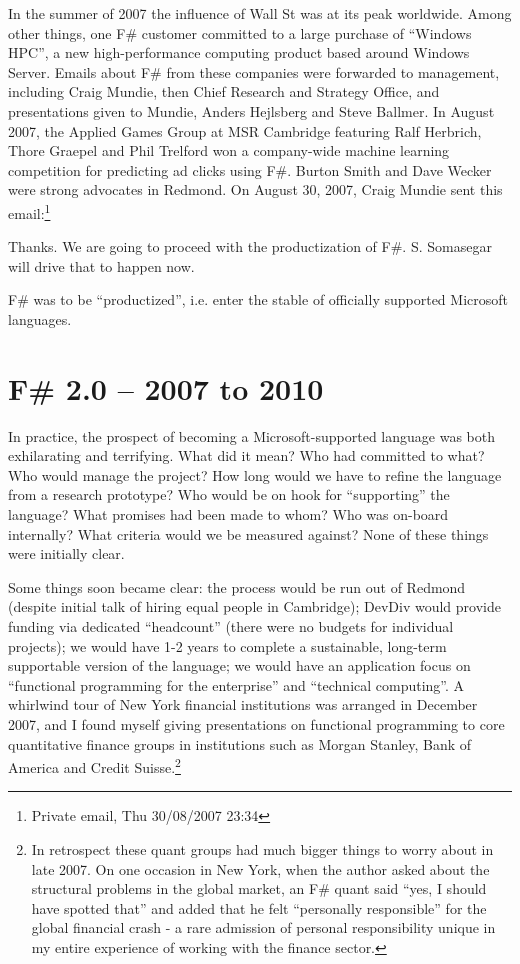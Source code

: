 \documentclass[acmsmall,review]{acmart}\settopmatter{printfolios=true,printccs=false,printacmref=false}
\begin{document}
In the summer of 2007 the influence of Wall St was at its peak worldwide. Among other things, one F\# customer
committed to a large purchase of “Windows HPC”, a new high-performance computing product based around
Windows Server. Emails about F\# from these companies were forwarded to management, including Craig Mundie,
then Chief Research and Strategy Office, and presentations given to Mundie, Anders Hejlsberg and Steve Ballmer.
In August 2007, the Applied Games Group at MSR Cambridge featuring Ralf Herbrich, Thore Graepel and Phil
Trelford won a company-wide machine learning competition for predicting ad clicks using F\#.  Burton Smith and
Dave Wecker were strong advocates in Redmond. On August 30, 2007, Craig Mundie sent this email:\footnote{Private email, Thu 30/08/2007 23:34}
\begin{verbquote}
Thanks.  We are going to proceed with the productization of F\#.  S. Somasegar will drive that to happen now.
\end{verbquote}
F\# was to be “productized”, i.e. enter the stable of officially supported Microsoft languages.

\section*{F\# 2.0 – 2007 to 2010}

In practice, the prospect of becoming a Microsoft-supported language was both exhilarating and terrifying. What did
it mean? Who had committed to what?  Who would manage the project? How long would we have to refine the
language from a research prototype?  Who would be on hook for “supporting” the language? What promises
had been made to whom? Who was on-board internally? What criteria would we be measured against?  None of these things were initially clear.  

Some things soon became clear: the process would be run out of Redmond (despite initial talk of hiring equal people in
Cambridge); DevDiv would provide funding via dedicated “headcount” (there were no budgets for individual projects); we
would have 1-2 years to complete a sustainable, long-term supportable version of the language; we would have an
application focus on “functional programming for the enterprise” and “technical computing”. A whirlwind tour of New York
financial institutions was arranged in December 2007, and I found myself giving presentations on functional programming
to core quantitative finance groups in institutions such as Morgan Stanley, Bank of America and
Credit Suisse.\footnote{ In retrospect these quant groups had much bigger things to worry about in
late 2007. On one occasion in New York, when the author asked about the structural problems in the
global market, an F\# quant said “yes, I should have spotted that” and added that he felt “personally
responsible” for the global financial crash - a rare admission of personal responsibility unique in my entire
experience of working with the finance sector.}
\end{document}
